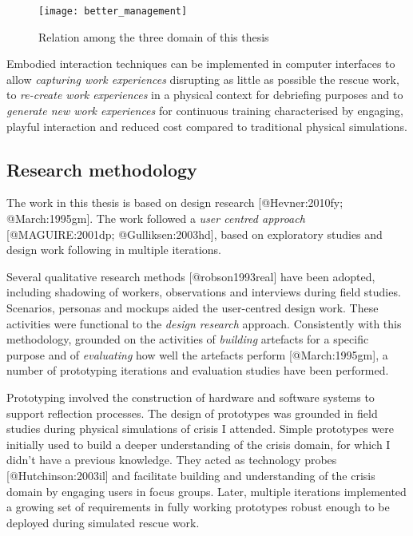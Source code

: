 \begin{figure}[tbh]
    \centering
    \texttt{[image: better\_management]}
    \caption{Relation among the three domain of this thesis}
    \label{fig:topic_relation}
\end{figure}

Embodied interaction techniques can be implemented in computer
interfaces to allow \emph{capturing work experiences} disrupting as
little as possible the rescue work, to \emph{re-create work experiences}
in a physical context for debriefing purposes and to \emph{generate new
work experiences} for continuous training characterised by engaging,
playful interaction and reduced cost compared to traditional physical
simulations.

\subsection{Research methodology}\label{research-methodology}

The work in this thesis is based on design research {[}@Hevner:2010fy;
@March:1995gm{]}. The work followed a \emph{user centred approach}
{[}@MAGUIRE:2001dp; @Gulliksen:2003hd{]}, based on exploratory studies
and design work following in multiple iterations.

Several qualitative research methods {[}@robson1993real{]} have been
adopted, including shadowing of workers, observations and interviews
during field studies. Scenarios, personas and mockups aided the
user-centred design work. These activities were functional to the
\emph{design research} approach. Consistently with this methodology,
grounded on the activities of \emph{building} artefacts for a specific
purpose and of \emph{evaluating} how well the artefacts perform
{[}@March:1995gm{]}, a number of prototyping iterations and evaluation
studies have been performed.

Prototyping involved the construction of hardware and software systems
to support reflection processes. The design of prototypes was grounded
in field studies during physical simulations of crisis I attended.
Simple prototypes were initially used to build a deeper understanding of
the crisis domain, for which I didn't have a previous knowledge. They
acted as technology probes {[}@Hutchinson:2003il{]} and facilitate
building and understanding of the crisis domain by engaging users in
focus groups. Later, multiple iterations implemented a growing set of
requirements in fully working prototypes robust enough to be deployed
during simulated rescue work.

